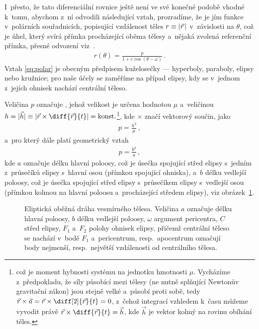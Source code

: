 \documentclass[A4paper, 12pt, oneside]{book}
\begin{document}
I~přesto, že tato diferenciální rovnice ještě není ve své konečné podobě vhodné k~tomu, abychom z~ní odvodili následující vztah, prozradíme, že je jím funkce v~polárních souřadnicích, popisující vzdálenost těles $r\equiv\lvert \vec{r} \,\rvert$ v~závislosti na  $\theta$, což je úhel, který svírá přímka procházející oběma tělesy a~nějaká zvolená referenční přímka, přesné odvození viz~\cite{murray00}.
\begin{align} \label{eq:polar}
	r(\theta)=\frac{p}{1+e\cos{(\theta-\omega)}}\,.
\end{align}
Vztah \eqref{eq:polar} je obecným předpisem kuželosečky --- hyperboly, paraboly, elipsy nebo kružnice; pro naše účely se zaměříme na případ elipsy, kdy se v~jednom z~jejích ohnisek nachází centrální těleso.

Veličina $p$ označuje , jehož velikost je určena hodnotou $\mu$ a~veličinou~$h=|\vec{h}| \equiv \left|\vec{r}\times\diff{\vec{r}}{t}\right|={\rm konst.}$\footnote{což je  moment hybnosti systému na jednotku hmotnosti $\mu$. Vycházíme z~předpokladu, že síly působící mezi tělesy (ne nutně splňující Newtonův gravitační zákon) jsou stejně velké a~působí proti sobě, tedy $\vec{r}\times\vec{a}=\vec{r}\times\diff[2]{\vec{r}}{t}=0$, z~čehož integrací vzhledem k~času můžeme vyvodit právě $\vec{r}\times\diff{\vec{r}}{t}=\vec{h}$, kde $\vec{h}$ je vektor kolmý na rovinu obíhání těles.}, kde $\times$ značí vektorový součin, jako
\begin{align}
	p=\frac{h^2}{\mu}\,,
\end{align}
a~pro který dále platí geometrický vztah
\begin{align}
	p=\frac{b^2}{a}\,,
\end{align}
kde $a$ označuje délku hlavní poloosy, což je úsečka spojující střed elipsy s~jedním z~průsečíků elipsy s~hlavní osou (přímkou spojující ohniska), a~$b$ délku vedlejší poloosy, což je úsečka spojující střed elipsy s~průsečíkem elipsy s~vedlejší osou (přímkou kolmou na hlavní poloosu a~procházející středem elipsy), viz obrázek~\ref{fig:elip}.

\begin{figure}
	\centering
	\caption{Eliptická oběžná dráha vesmírného tělesa. Veličina $a$ označuje délku hlavní poloosy, $b$ délku vedlejší poloosy, $\omega$ argument pericentra, $C$ střed elipsy, $F_1$ a~$F_2$ polohy ohnisek elipsy, přičemž centrální těleso se nachází v~bodě $F_1$ a~pericentrum, resp.\ apocentrum označují body nejmenší, resp.\ největší vzdálenosti od centrálního tělesa.} \label{fig:elip}
\end{figure}
\end{document}
